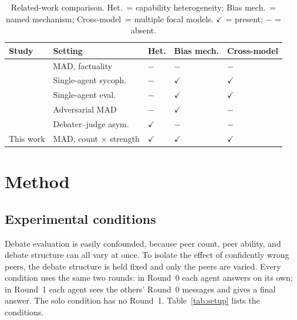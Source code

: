 \documentclass[11pt]{article}
\begin{document}
\begin{table}[t]
\centering
\small
\caption{Related-work comparison. Het.\ = capability heterogeneity; Bias mech.\ = named mechanism; Cross-model\ = multiple focal models. $\checkmark$ = present; $-$ = absent.\label{tab:relwork}}
\begin{tabular}{@{}lllll@{}}
\toprule
Study & Setting & Het. & Bias mech. & Cross-model \\
\midrule
\citet{du2023improving}          & MAD, factuality       & $-$          & $-$          & $-$          \\
\citet{sharma2023towards}        & Single-agent sycoph.  & $-$          & $\checkmark$ & $\checkmark$ \\
\citet{koo2024benchmarking}      & Single-agent eval.    & $-$          & $\checkmark$ & $\checkmark$ \\
\citet{amayuelas2024multiagent}  & Adversarial MAD       & $-$          & $\checkmark$ & $-$          \\
\citet{khan2024debating}         & Debater--judge asym.  & $\checkmark$ & $-$          & $-$          \\
This work                        & MAD, count $\times$ strength & $\checkmark$ & $\checkmark$ & $\checkmark$ \\
\bottomrule
\end{tabular}
\end{table}

\section{Method}
\label{sec:method}

\subsection{Experimental conditions}
\label{sub:conditions}

Debate evaluation is easily confounded, because peer count, peer ability,
and debate structure can all vary at once.
To isolate the effect of confidently wrong peers, the debate structure is
held fixed and only the peers are varied.
Every condition uses the same two rounds: in Round~0 each agent answers on
its own; in Round~1 each agent sees the others' Round~0 messages and gives
a final answer.
The solo condition has no Round~1.
Table~\ref{tab:setup} lists the conditions.
\end{document}
